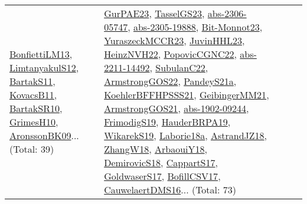 {\begin{longtable}{lp{3cm}>{\raggedright}p{6cm}>{\raggedright}p{6cm}p{8cm}}
\href{papers/BonfiettiLM13.pdf}{BonfiettiLM13}\cite{BonfiettiLM13}, \href{articles/LimtanyakulS12.pdf}{LimtanyakulS12}\cite{LimtanyakulS12}, \href{articles/BartakS11.pdf}{BartakS11}\cite{BartakS11}, \href{articles/KovacsB11.pdf}{KovacsB11}\cite{KovacsB11}, \href{articles/BartakSR10.pdf}{BartakSR10}\cite{BartakSR10}, \href{papers/GrimesH10.pdf}{GrimesH10}\cite{GrimesH10}, \href{papers/AronssonBK09.pdf}{AronssonBK09}\cite{AronssonBK09}... (Total: 39) & \href{articles/GurPAE23.pdf}{GurPAE23}\cite{GurPAE23}, \href{papers/TasselGS23.pdf}{TasselGS23}\cite{TasselGS23}, \href{articles/abs-2306-05747.pdf}{abs-2306-05747}\cite{abs-2306-05747}, \href{articles/abs-2305-19888.pdf}{abs-2305-19888}\cite{abs-2305-19888}, \href{papers/Bit-Monnot23.pdf}{Bit-Monnot23}\cite{Bit-Monnot23}, \href{articles/YuraszeckMCCR23.pdf}{YuraszeckMCCR23}\cite{YuraszeckMCCR23}, \href{papers/JuvinHHL23.pdf}{JuvinHHL23}\cite{JuvinHHL23}, \href{articles/HeinzNVH22.pdf}{HeinzNVH22}\cite{HeinzNVH22}, \href{papers/PopovicCGNC22.pdf}{PopovicCGNC22}\cite{PopovicCGNC22}, \href{articles/abs-2211-14492.pdf}{abs-2211-14492}\cite{abs-2211-14492}, \href{articles/SubulanC22.pdf}{SubulanC22}\cite{SubulanC22}, \href{papers/ArmstrongGOS22.pdf}{ArmstrongGOS22}\cite{ArmstrongGOS22}, \href{articles/PandeyS21a.pdf}{PandeyS21a}\cite{PandeyS21a}, \href{articles/KoehlerBFFHPSSS21.pdf}{KoehlerBFFHPSSS21}\cite{KoehlerBFFHPSSS21}, \href{papers/GeibingerMM21.pdf}{GeibingerMM21}\cite{GeibingerMM21}, \href{papers/ArmstrongGOS21.pdf}{ArmstrongGOS21}\cite{ArmstrongGOS21}, \href{articles/abs-1902-09244.pdf}{abs-1902-09244}\cite{abs-1902-09244}, \href{papers/FrimodigS19.pdf}{FrimodigS19}\cite{FrimodigS19}, \href{articles/HauderBRPA19.pdf}{HauderBRPA19}\cite{HauderBRPA19}, \href{articles/WikarekS19.pdf}{WikarekS19}\cite{WikarekS19}, \href{papers/Laborie18a.pdf}{Laborie18a}\cite{Laborie18a}, \href{papers/AstrandJZ18.pdf}{AstrandJZ18}\cite{AstrandJZ18}, \href{articles/ZhangW18.pdf}{ZhangW18}\cite{ZhangW18}, \href{papers/ArbaouiY18.pdf}{ArbaouiY18}\cite{ArbaouiY18}, \href{papers/DemirovicS18.pdf}{DemirovicS18}\cite{DemirovicS18}, \href{papers/CappartS17.pdf}{CappartS17}\cite{CappartS17}, \href{papers/GoldwaserS17.pdf}{GoldwaserS17}\cite{GoldwaserS17}, \href{papers/BofillCSV17.pdf}{BofillCSV17}\cite{BofillCSV17}, \href{papers/CauwelaertDMS16.pdf}{CauwelaertDMS16}\cite{CauwelaertDMS16}... (Total: 73)\\

\end{longtable}}
